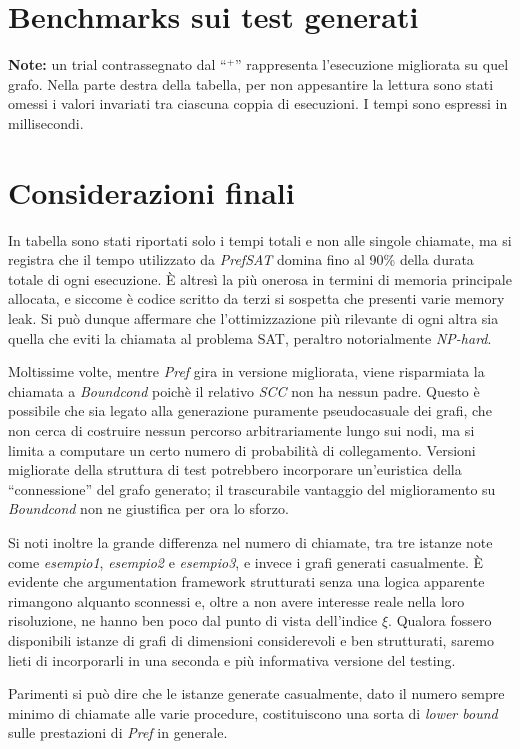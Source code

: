 \section{Benchmarks sui test generati}
\textbf{Note:} un trial contrassegnato dal ``$^+$'' rappresenta l'esecuzione migliorata su quel grafo.
 Nella parte destra della tabella, per non appesantire la lettura sono stati omessi
i valori invariati tra ciascuna coppia di esecuzioni. I tempi sono espressi in millisecondi.


\section{Considerazioni finali}
In tabella sono stati riportati solo i tempi totali e non alle singole chiamate,
ma si registra che il tempo utilizzato da \emph{PrefSAT} domina fino al 90\%
della durata totale di ogni esecuzione. È altresì la più onerosa in termini di
memoria principale allocata, e siccome è codice scritto da terzi si sospetta che
presenti varie memory leak. Si può dunque affermare che l'ottimizzazione più rilevante di ogni altra sia quella che
eviti la chiamata al problema SAT, peraltro notorialmente \emph{NP-hard}.

Moltissime volte, mentre \emph{Pref} gira in versione migliorata, viene risparmiata la chiamata a \emph{Boundcond}
poichè il relativo \emph{SCC} non ha nessun padre. Questo è possibile che sia legato alla generazione puramente pseudocasuale
dei grafi, che non cerca di costruire nessun percorso arbitrariamente lungo sui nodi, ma si limita a computare un certo numero
di probabilità di collegamento. Versioni migliorate della struttura di test potrebbero incorporare un'euristica della ``connessione''
del grafo generato; il trascurabile vantaggio del miglioramento su \emph{Boundcond} non ne giustifica per ora lo sforzo.

Si noti inoltre la grande differenza nel numero di chiamate, tra tre istanze note come \emph{esempio1}, \emph{esempio2} e \emph{esempio3},
e invece i grafi generati casualmente. È evidente che argumentation framework strutturati senza una logica apparente rimangono alquanto
sconnessi e, oltre a non avere interesse reale nella loro risoluzione, ne hanno ben poco dal punto di vista dell'indice $\xi$. Qualora fossero
disponibili istanze di grafi di dimensioni considerevoli e ben strutturati, saremo lieti di incorporarli in una seconda e più informativa versione 
del testing. 

Parimenti si può dire che le istanze generate casualmente, dato il numero sempre minimo di chiamate alle varie procedure, costituiscono una sorta
di \emph{lower bound} sulle prestazioni di \emph{Pref} in generale.